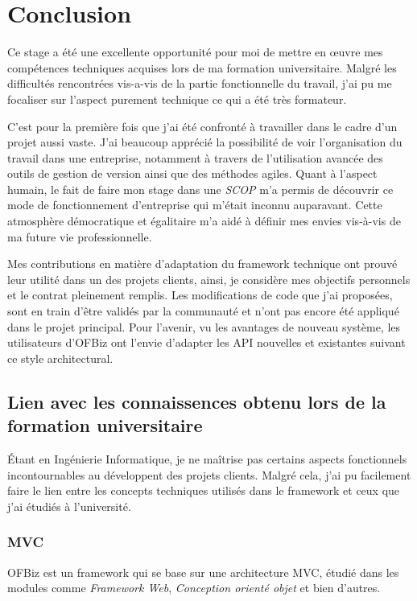 \chapter{Conclusion}
Ce stage a été une excellente opportunité pour moi de mettre en œuvre mes compétences techniques acquises lors de ma formation universitaire. Malgré les difficultés rencontrées vis-a-vis de la partie fonctionnelle du travail, j'ai pu me focaliser sur l'aspect purement technique ce qui a été très formateur. 

C'est pour la première fois que j'ai été confronté à travailler dans le cadre d'un projet aussi vaste. J'ai beaucoup apprécié la possibilité de voir l'organisation du travail dans une entreprise, notamment à travers de l'utilisation avancée des outils de gestion de version ainsi que des méthodes agiles. Quant à l'aspect humain, le fait de faire mon stage dans une \emph{SCOP} m'a permis de découvrir ce mode de fonctionnement d'entreprise qui m'était inconnu auparavant. Cette atmosphère démocratique et égalitaire m'a aidé à définir mes envies vis-à-vis de ma future vie professionnelle.

Mes contributions en matière d'adaptation du framework technique ont prouvé leur utilité dans un des projets clients, ainsi, je considère mes objectifs personnels et le contrat pleinement remplis. Les modifications de code que j'ai proposées, sont en train d'être validés par la communauté et n'ont pas encore été appliqué dans le projet principal.
Pour l'avenir, vu les avantages de nouveau système, les utilisateurs d'OFBiz ont l'envie d'adapter les API nouvelles et existantes suivant ce style architectural.



\section{Lien avec les connaissences obtenu lors de la formation universitaire}
Étant en Ingénierie Informatique, je ne maîtrise pas certains aspects fonctionnels incontournables au développent des projets clients. Malgré cela, j'ai pu facilement faire le lien entre les concepts techniques utilisés dans le framework et ceux que j'ai étudiés à l'université. 
\subsection{MVC}
OFBiz est un framework qui se base sur une architecture MVC, étudié dans les modules comme \emph{Framework Web}, \emph{Conception orienté objet} et bien d'autres. 
